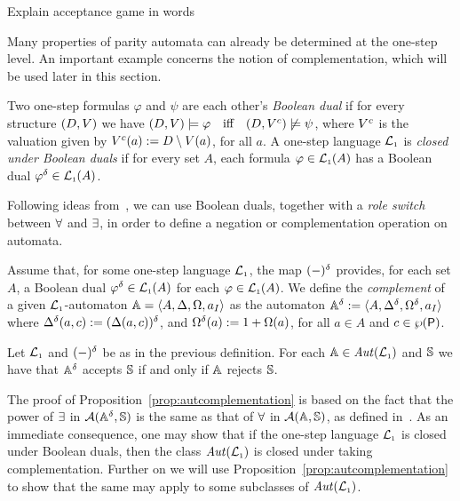 \btbs
\item
Explain acceptance game in words
\etbs

Many properties of parity automata can already be determined at the one-step
level.
An important example concerns the notion of complementation, which will be used
later in this section.

\begin{definition}
\label{d:bdual1}
Two one-step formulas $\varphi$ and $\psi$ are each other's \emph{Boolean dual}
if for every structure $(D,V)$ we have $(D,\val) \models \varphi\quad
\text{iff}\quad (D,\val^{c}) \not\models \psi$, where $V^{c}$ is the 
valuation given by $V^{c}(a) \mathrel{:=} D \setminus V(a)$, for all $a$.
%
A one-step language $\mathcal{L}_{\scriptscriptstyle 1}$ is \emph{closed under Boolean duals} if for every
set $A$, each formula $\varphi \in \mathcal{L}_{\scriptscriptstyle 1}(A)$ has a Boolean dual $\varphi^{\delta}
\in \mathcal{L}_{\scriptscriptstyle 1}(A)$.
\end{definition}

Following ideas from~\cite{Muller1987,DBLP:conf/calco/KissigV09}, we can use
Boolean duals, together with a \emph{role switch} between $\forall$ and
$\exists$, in order to define a negation or complementation operation on 
automata.

\begin{definition}
\label{d:caut}
Assume that, for some one-step language $\mathcal{L}_{\scriptscriptstyle 1}$, the map $(-)^{\delta}$
provides, for each set $A$, a Boolean dual $\varphi^{\delta} \in \mathcal{L}_{\scriptscriptstyle 1}(A)$ for each
$\varphi \in \mathcal{L}_{\scriptscriptstyle 1}(A)$.
We define the \emph{complement} of a given $\mathcal{L}_{\scriptscriptstyle 1}$-automaton 
$\mathbb{A} = \langle{A,\Delta,\Omega,a_I}\rangle$ as the automaton $\mathbb{A}^{\delta} \mathrel{:=} 
\langle{A,\Delta^{\delta},\Omega^{\delta},a_I}\rangle$ where $\Delta^{\delta}(a,c) \mathrel{:=}
(\Delta(a,c))^{\delta}$, and $\Omega^{\delta}(a) \mathrel{:=} 1 + \Omega(a)$, for all 
$a \in A$ and $c \in \wp(\mathsf{P})$.
\end{definition}

\begin{proposition}
\label{prop:autcomplementation}
Let $\mathcal{L}_{\scriptscriptstyle 1}$ and $(-)^{\delta}$ be as in the previous definition.
For each $\mathbb{A} \in \mathit{Aut}(\mathcal{L}_{\scriptscriptstyle 1})$ and $\mathbb{S}$ we have that $\mathbb{A}^{\delta}$ accepts
$\mathbb{S}$ if and only if $\mathbb{A}$ rejects $\mathbb{S}$.
\end{proposition}

The proof of Proposition~\ref{prop:autcomplementation} is based on the fact
that the power of $\exists$ in $\mathcal{A}(\mathbb{A}^{\delta},\mathbb{S})$ is the same
as that of $\forall$ in $\mathcal{A}(\mathbb{A},\mathbb{S})$, as defined 
in~\cite{DBLP:conf/calco/KissigV09}. 
As an immediate consequence, one may show that if the one-step language $\mathcal{L}_{\scriptscriptstyle 1}$
is closed under Boolean duals, then the class $\mathit{Aut}(\mathcal{L}_{\scriptscriptstyle 1})$ is closed under 
taking complementation.
Further on we will use Proposition~\ref{prop:autcomplementation} to show that
the same may apply to some subclasses of $\mathit{Aut}(\mathcal{L}_{\scriptscriptstyle 1})$.

